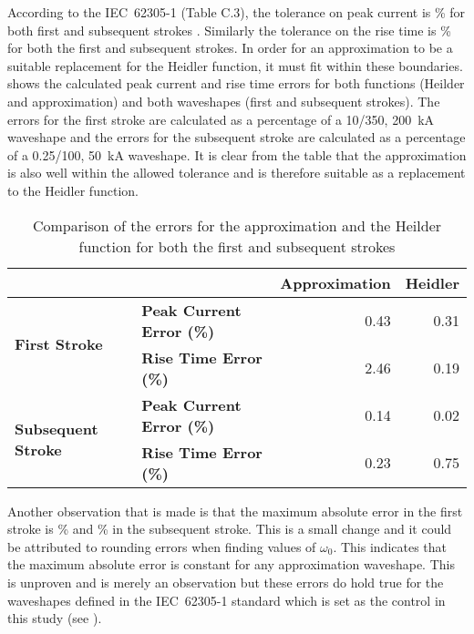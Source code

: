 According to the IEC~62305-1 (Table C.3), the tolerance on peak current is \% for both first and subsequent strokes \cite{IEC623051}. Similarly the tolerance on the rise time is \% for both the first and subsequent strokes. In order for an approximation to be a suitable replacement for the Heidler function, it must fit within these boundaries.  shows the calculated peak current and rise time errors for both functions (Heilder and approximation) and both waveshapes (first and subsequent strokes). The errors for the first stroke are calculated as a percentage of a 10/350, 200~kA waveshape and the errors for the subsequent stroke are calculated as a percentage of a 0.25/100, 50~kA waveshape. It is clear from the table that the approximation is also well within the allowed tolerance and is therefore suitable as a replacement to the Heidler function.
\begin{table}[htbp]
    \centering
    \caption{Comparison of the errors for the approximation and the Heilder function for both the first and subsequent strokes}\label{tab:IecErrorTolerance}
    \begin{tabular}{ll|ll}
         & & \textbf{Approximation} & \textbf{Heidler} \\ \hline
        \multirow{2}{*}{\textbf{First Stroke}} & \textbf{Peak Current Error (\%)} & \multicolumn{1}{r}{0.43} & \multicolumn{1}{r}{0.31} \\
         & \textbf{Rise Time Error (\%)} & \multicolumn{1}{r}{2.46} & \multicolumn{1}{r}{0.19} \\ \hline
        \multirow{2}{*}{\textbf{Subsequent Stroke}} & \textbf{Peak Current Error (\%)} & \multicolumn{1}{r}{0.14} & \multicolumn{1}{r}{0.02} \\
         & \textbf{Rise Time Error (\%)} & \multicolumn{1}{r}{0.23} & \multicolumn{1}{r}{0.75}
    \end{tabular}
\end{table}

Another observation that is made is that the maximum absolute error in the first stroke is \unskip \% and \unskip \% in the subsequent stroke. This is a small change and it could be attributed to rounding errors when finding values of $\omega_0$. This indicates that the maximum absolute error is constant for any approximation waveshape. This is unproven and is merely an observation but these errors do hold true for the waveshapes defined in the IEC~62305-1 standard which is set as the control in this study (see ).

